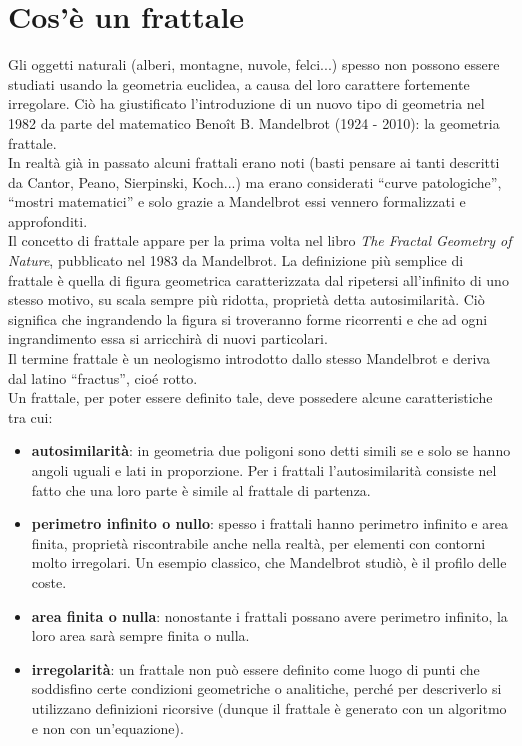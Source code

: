 \documentclass[10pt]{report}
\begin{document}
		\section{Cos'è un frattale}
			Gli oggetti naturali (alberi, montagne, nuvole, felci...) spesso non possono essere studiati usando la geometria euclidea, a causa del loro carattere fortemente irregolare. Ciò ha giustificato l'introduzione di un nuovo tipo di geometria nel 1982 da parte del matematico Benoît B. Mandelbrot (1924 - 2010): la geometria frattale.\\
			In realtà già in passato alcuni frattali erano noti (basti pensare ai tanti descritti da Cantor, Peano, Sierpinski, Koch...) ma erano considerati ``curve patologiche'', ``mostri matematici'' e solo grazie a Mandelbrot essi vennero formalizzati e approfonditi.\\
			Il concetto di frattale appare per la prima volta nel libro \textit{The Fractal Geometry of Nature}, pubblicato nel 1983 da Mandelbrot. La definizione più semplice di frattale è quella di  figura geometrica caratterizzata dal ripetersi all'infinito di uno stesso motivo, su scala sempre più ridotta, proprietà detta autosimilarità. Ciò significa che ingrandendo la figura si troveranno forme ricorrenti e che ad ogni ingrandimento essa si arricchirà di nuovi particolari.\\
			Il termine frattale è un neologismo introdotto dallo stesso Mandelbrot e deriva dal latino ``fractus'', cioé rotto.\\
			Un frattale, per poter essere definito tale, deve possedere alcune caratteristiche tra cui:
			\begin{itemize}
				\item \textbf{autosimilarità}: in geometria due poligoni sono detti simili se e solo se hanno angoli uguali e lati in proporzione. Per i frattali l'autosimilarità consiste nel fatto che una loro parte è simile al frattale di partenza.
				\item \textbf{perimetro infinito o nullo}: spesso i frattali hanno perimetro infinito e area finita, proprietà riscontrabile anche nella realtà, per elementi con contorni molto irregolari. Un esempio classico, che Mandelbrot studiò, è il profilo delle coste. 
				\item \textbf{area finita o nulla}: nonostante i frattali possano avere perimetro infinito, la loro area sarà sempre finita o nulla.
				\item \textbf{irregolarità}: un frattale non può essere definito come luogo di punti che soddisfino certe condizioni geometriche o analitiche, perché per descriverlo si utilizzano definizioni ricorsive (dunque il frattale è generato con un algoritmo e non con un'equazione).
			\end{itemize}
			
\end{document}
